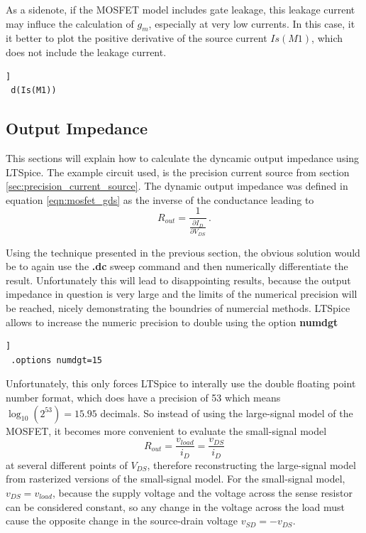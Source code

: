 \documentclass[12pt]{book}
\begin{document}
As a sidenote, if the MOSFET model includes gate leakage, this leakage current may influce the calculation of $g_m$, especially at very low currents. In this case, it it better to plot the positive derivative of the source current $Is(M1)$, which does not include the leakage current.
\begin{lstlisting}[frame=single, xleftmargin=5mm, xrightmargin=5mm, columns=fullflexible, morekeywords={model, dc}, keywordstyle=\bfseries, basicstyle=\rmfamily]]
 d(Is(M1))
\end{lstlisting}

\subsection{Output Impedance}
This sections will explain how to calculate the dyncamic output impedance using LTSpice. The example circuit used, is the precision current source from section \ref{sec:precision_current_source}. The dynamic output impedance was defined in equation \ref{eqn:mosfet_gds} as the inverse of the conductance leading to
\begin{equation}
    R_{out} = \frac{1}{\frac{\partial I_D}{\partial V_{DS}}} \,. \nonumber
\end{equation}

Using the technique presented in the previous section, the obvious solution would be to again use the \textbf{.dc} sweep command and then numerically differentiate the result. Unfortunately this will lead to disappointing results, because the output impedance in question is very large and the limits of the numerical precision will be reached, nicely demonstrating the boundries of numercial methods. LTSpice allows to increase the numeric precision to double using the option \textbf{numdgt}
\begin{lstlisting}[frame=single, xleftmargin=5mm, xrightmargin=5mm, columns=fullflexible, morekeywords={model, dc, options}, keywordstyle=\bfseries, basicstyle=\rmfamily]]
 .options numdgt=15
\end{lstlisting}
Unfortunately, this only forces LTSpice to interally use the double floating point number format, which does have a precision of \qty{53}{\bit} which means $\log_{10}\left(2^{53}\right) = 15.95$ decimals. So instead of using the large-signal model of the MOSFET, it becomes more convenient to evaluate the small-signal model
\begin{equation}
    R_{out} = \frac{v_{load}}{i_D} = \frac{v_{DS}}{i_D} \nonumber
\end{equation}
at several different points of $V_{DS}$, therefore reconstructing the large-signal model from rasterized versions of the small-signal model. For the small-signal model, $v_{DS} = v_{load}$, because the supply voltage and the voltage across the sense resistor can be considered constant, so any change in the voltage across the load must cause the opposite change in the source-drain voltage $v_{SD} = - v_{DS}$.
\end{document}
